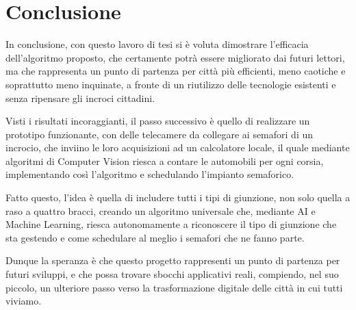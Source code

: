 \chapter*{Conclusione}

In conclusione, con questo lavoro di tesi si è voluta dimostrare l'efficacia dell'algoritmo proposto, che certamente potrà essere migliorato dai futuri lettori, ma che rappresenta un punto di partenza per città più efficienti, meno caotiche e soprattutto meno inquinate, a fronte di un riutilizzo delle tecnologie esistenti e senza ripensare gli incroci cittadini.

Visti i risultati incoraggianti, il passo successivo è quello di realizzare un prototipo funzionante, con delle telecamere da collegare ai semafori di un incrocio, che inviino le loro acquisizioni ad un calcolatore locale, il quale mediante algoritmi di Computer Vision riesca a contare le automobili per ogni corsia, implementando così l'algoritmo e schedulando l'impianto semaforico.

Fatto questo, l'idea è quella di includere tutti i tipi di giunzione, non solo quella a raso a quattro bracci, creando un algoritmo universale che, mediante AI e Machine Learning, riesca autonomamente a riconoscere il tipo di giunzione che sta gestendo e come schedulare al meglio i semafori che ne fanno parte.


Dunque la speranza è che questo progetto rappresenti un punto di partenza per futuri sviluppi, e che possa trovare sbocchi applicativi reali, compiendo, nel suo piccolo, un ulteriore passo verso la trasformazione digitale delle città in cui tutti viviamo.
